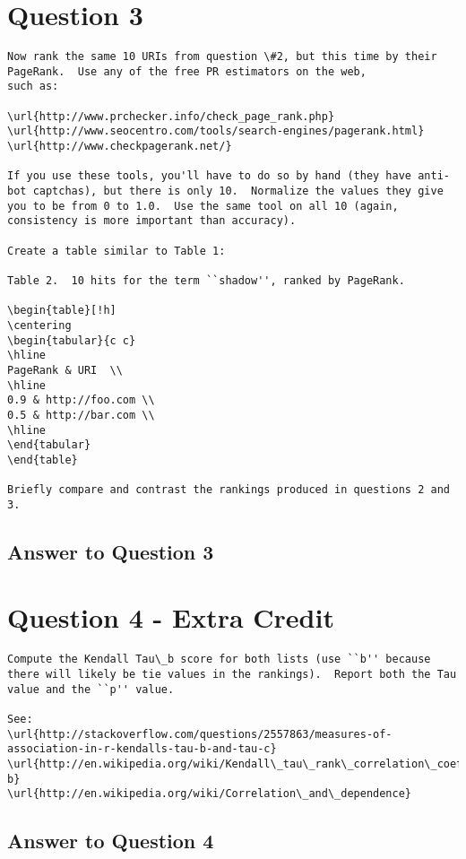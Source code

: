 \documentclass{article}
\begin{document}
\section*{Question 3}
\begin{verbatim}
Now rank the same 10 URIs from question \#2, but this time by their PageRank.  Use any of the free PR estimators on the web,
such as:

\url{http://www.prchecker.info/check_page_rank.php}
\url{http://www.seocentro.com/tools/search-engines/pagerank.html}
\url{http://www.checkpagerank.net/}

If you use these tools, you'll have to do so by hand (they have anti-bot captchas), but there is only 10.  Normalize the values they give you to be from 0 to 1.0.  Use the same tool on all 10 (again, consistency is more important than accuracy).

Create a table similar to Table 1:

Table 2.  10 hits for the term ``shadow'', ranked by PageRank.

\begin{table}[!h]
\centering
\begin{tabular}{c c}
\hline
PageRank & URI  \\
\hline
0.9 & http://foo.com \\
0.5 & http://bar.com \\
\hline
\end{tabular}
\end{table}

Briefly compare and contrast the rankings produced in questions 2 and 3.
\end{verbatim}

\subsection*{Answer to Question 3}

\section*{Question 4 - Extra Credit}
\begin{verbatim}
Compute the Kendall Tau\_b score for both lists (use ``b'' because there will likely be tie values in the rankings).  Report both the Tau value and the ``p'' value.

See: 
\url{http://stackoverflow.com/questions/2557863/measures-of-association-in-r-kendalls-tau-b-and-tau-c}
\url{http://en.wikipedia.org/wiki/Kendall\_tau\_rank\_correlation\_coefficient\#Tau-b}
\url{http://en.wikipedia.org/wiki/Correlation\_and\_dependence}

\end{verbatim}
\subsection*{Answer to Question 4}
\end{document}

